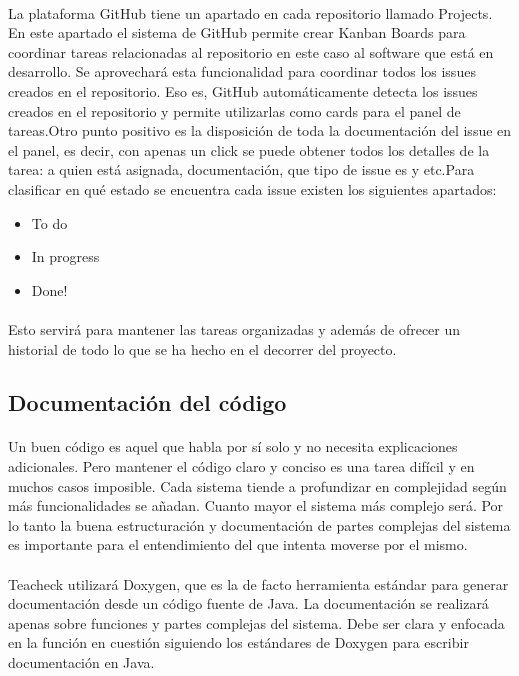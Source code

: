 \paragraph{}
La plataforma GitHub tiene un apartado en cada repositorio llamado Projects. En este apartado el sistema de GitHub permite crear Kanban Boards para coordinar tareas relacionadas al repositorio en este caso al software que está en desarrollo. Se aprovechará esta funcionalidad para coordinar todos los issues creados en el repositorio. Eso es, GitHub automáticamente detecta los issues creados en el repositorio y permite utilizarlas como cards para el panel de tareas.Otro punto positivo es la disposición de toda la documentación del issue en el panel, es decir, con apenas un click se puede obtener todos los detalles de la tarea: a quien está asignada, documentación, que tipo de issue es y etc.Para clasificar en qué estado se encuentra cada issue existen los siguientes apartados:

\begin{itemize}
\item
  To do
\item
  In progress
\item
  Done!
\end{itemize}
\paragraph{}
Esto servirá para mantener las tareas organizadas y además de ofrecer un historial de todo lo que se ha hecho en el decorrer del proyecto.

\subsection{Documentación del código}
\paragraph{}
Un buen código es aquel que habla por sí solo y no necesita explicaciones adicionales. Pero mantener el código claro y conciso es una tarea difícil y en muchos casos imposible. Cada sistema tiende a profundizar en complejidad según más funcionalidades se añadan. Cuanto mayor el sistema más complejo será. Por lo tanto la buena estructuración y documentación de partes complejas del sistema es importante para el entendimiento del que intenta moverse por el mismo.

\paragraph{}
Teacheck utilizará Doxygen, que es la de facto herramienta estándar para generar documentación desde un código fuente de Java. La documentación se realizará apenas sobre funciones y partes complejas del sistema. Debe ser clara y enfocada en la función en cuestión siguiendo los estándares de Doxygen para escribir documentación en Java.

